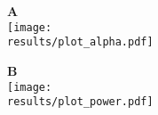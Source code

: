 \documentclass{article}
\begin{document}
\newcommand{\results}{../../simulations}

\begin{figure}[bt]
\begin{minipage}{0.48\textwidth}
    {\Large \textbf{\textsf{A}}} \\
\texttt{[image: \\results/plot\_alpha.pdf]}
\end{minipage}
\begin{minipage}{0.48\textwidth}
    {\Large \textbf{\textsf{B}}} \\
\texttt{[image: \\results/plot\_power.pdf]}
\end{minipage}
\end{figure}
\end{document}
